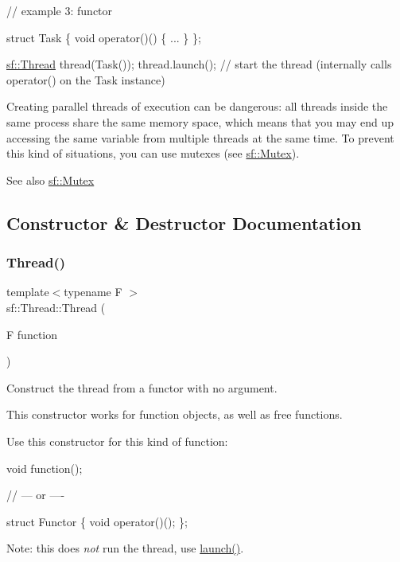 \begin{DoxyCode}
\textcolor{comment}{// example 3: functor}

\textcolor{keyword}{struct }Task
\{
    \textcolor{keywordtype}{void} operator()()
    \{
        ...
    \}
\};

\hyperlink{classsf_1_1_thread}{sf::Thread} thread(Task());
thread.launch(); \textcolor{comment}{// start the thread (internally calls operator() on the Task instance)}
\end{DoxyCode}


Creating parallel threads of execution can be dangerous\+: all threads inside the same process share the same memory space, which means that you may end up accessing the same variable from multiple threads at the same time. To prevent this kind of situations, you can use mutexes (see \hyperlink{classsf_1_1_mutex}{sf\+::\+Mutex}).

\begin{DoxySeeAlso}{See also}
\hyperlink{classsf_1_1_mutex}{sf\+::\+Mutex} 
\end{DoxySeeAlso}


\subsection{Constructor \& Destructor Documentation}
\mbox{\label{classsf_1_1_thread_a4cc65399bbb111cf8132537783b8e96c}} 
\subsubsection{\texorpdfstring{Thread()}{Thread()}\hspace{0.1cm}{\footnotesize\ttfamily [1/3]}}
{\footnotesize\ttfamily template$<$typename F $>$ \\
sf\+::\+Thread\+::\+Thread (\begin{DoxyParamCaption}\item[{F}]{function }\end{DoxyParamCaption})}



Construct the thread from a functor with no argument. 

This constructor works for function objects, as well as free functions.

Use this constructor for this kind of function\+: 
\begin{DoxyCode}
\textcolor{keywordtype}{void} \textcolor{keyword}{function}();

\textcolor{comment}{// --- or ----}

\textcolor{keyword}{struct }Functor
\{
    \textcolor{keywordtype}{void} operator()();
\};
\end{DoxyCode}
 Note\+: this does {\itshape not} run the thread, use \hyperlink{classsf_1_1_thread_a74f75a9e86e1eb47479496314048b5f6}{launch()}.


